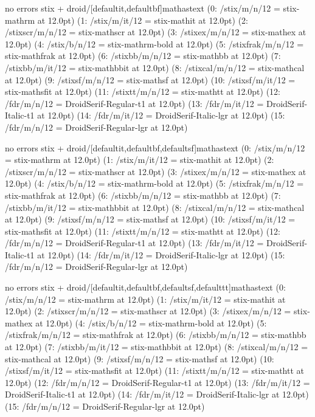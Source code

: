 \documentclass[12pt]{article}
\begin{document}
no errors
stix + droid/[defaultit,defaultbf]mathastext
(0: /stix/m/n/12 = stix-mathrm at 12.0pt)
(1: /stix/m/it/12 = stix-mathit at 12.0pt)
(2: /stixscr/m/n/12 = stix-mathscr at 12.0pt)
(3: /stixex/m/n/12 = stix-mathex at 12.0pt)
(4: /stix/b/n/12 = stix-mathrm-bold at 12.0pt)
(5: /stixfrak/m/n/12 = stix-mathfrak at 12.0pt)
(6: /stixbb/m/n/12 = stix-mathbb at 12.0pt)
(7: /stixbb/m/it/12 = stix-mathbbit at 12.0pt)
(8: /stixcal/m/n/12 = stix-mathcal at 12.0pt)
(9: /stixsf/m/n/12 = stix-mathsf at 12.0pt)
(10: /stixsf/m/it/12 = stix-mathsfit at 12.0pt)
(11: /stixtt/m/n/12 = stix-mathtt at 12.0pt)
(12: /fdr/m/n/12 = DroidSerif-Regular-t1 at 12.0pt)
(13: /fdr/m/it/12 = DroidSerif-Italic-t1 at 12.0pt)
(14: \LGR/fdr/m/it/12 = DroidSerif-Italic-lgr at 12.0pt)
(15: \LGR/fdr/m/n/12 = DroidSerif-Regular-lgr at 12.0pt)

no errors
stix + droid/[defaultit,defaultbf,defaultsf]mathastext
(0: /stix/m/n/12 = stix-mathrm at 12.0pt)
(1: /stix/m/it/12 = stix-mathit at 12.0pt)
(2: /stixscr/m/n/12 = stix-mathscr at 12.0pt)
(3: /stixex/m/n/12 = stix-mathex at 12.0pt)
(4: /stix/b/n/12 = stix-mathrm-bold at 12.0pt)
(5: /stixfrak/m/n/12 = stix-mathfrak at 12.0pt)
(6: /stixbb/m/n/12 = stix-mathbb at 12.0pt)
(7: /stixbb/m/it/12 = stix-mathbbit at 12.0pt)
(8: /stixcal/m/n/12 = stix-mathcal at 12.0pt)
(9: /stixsf/m/n/12 = stix-mathsf at 12.0pt)
(10: /stixsf/m/it/12 = stix-mathsfit at 12.0pt)
(11: /stixtt/m/n/12 = stix-mathtt at 12.0pt)
(12: /fdr/m/n/12 = DroidSerif-Regular-t1 at 12.0pt)
(13: /fdr/m/it/12 = DroidSerif-Italic-t1 at 12.0pt)
(14: \LGR/fdr/m/it/12 = DroidSerif-Italic-lgr at 12.0pt)
(15: \LGR/fdr/m/n/12 = DroidSerif-Regular-lgr at 12.0pt)

no errors
stix + droid/[defaultit,defaultbf,defaultsf,defaulttt]mathastext
(0: /stix/m/n/12 = stix-mathrm at 12.0pt)
(1: /stix/m/it/12 = stix-mathit at 12.0pt)
(2: /stixscr/m/n/12 = stix-mathscr at 12.0pt)
(3: /stixex/m/n/12 = stix-mathex at 12.0pt)
(4: /stix/b/n/12 = stix-mathrm-bold at 12.0pt)
(5: /stixfrak/m/n/12 = stix-mathfrak at 12.0pt)
(6: /stixbb/m/n/12 = stix-mathbb at 12.0pt)
(7: /stixbb/m/it/12 = stix-mathbbit at 12.0pt)
(8: /stixcal/m/n/12 = stix-mathcal at 12.0pt)
(9: /stixsf/m/n/12 = stix-mathsf at 12.0pt)
(10: /stixsf/m/it/12 = stix-mathsfit at 12.0pt)
(11: /stixtt/m/n/12 = stix-mathtt at 12.0pt)
(12: /fdr/m/n/12 = DroidSerif-Regular-t1 at 12.0pt)
(13: /fdr/m/it/12 = DroidSerif-Italic-t1 at 12.0pt)
(14: \LGR/fdr/m/it/12 = DroidSerif-Italic-lgr at 12.0pt)
(15: \LGR/fdr/m/n/12 = DroidSerif-Regular-lgr at 12.0pt)
\end{document}
